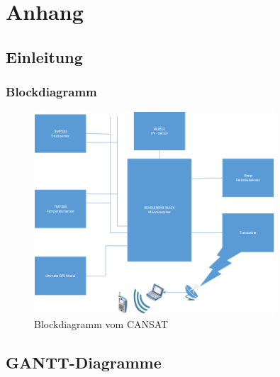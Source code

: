 \section{Anhang}

\subsection{Einleitung}
\subsubsection{Blockdiagramm}
\begin{figure}[htbp]
	\centering
	\includegraphics[width=0.8\textwidth]{8_Anhang/Blockdiagramm.png}
	\caption{Blockdiagramm vom CANSAT}
	\label{blockdiagramm}
\end{figure}

\newpage

\subsection{GANTT-Diagramme}
